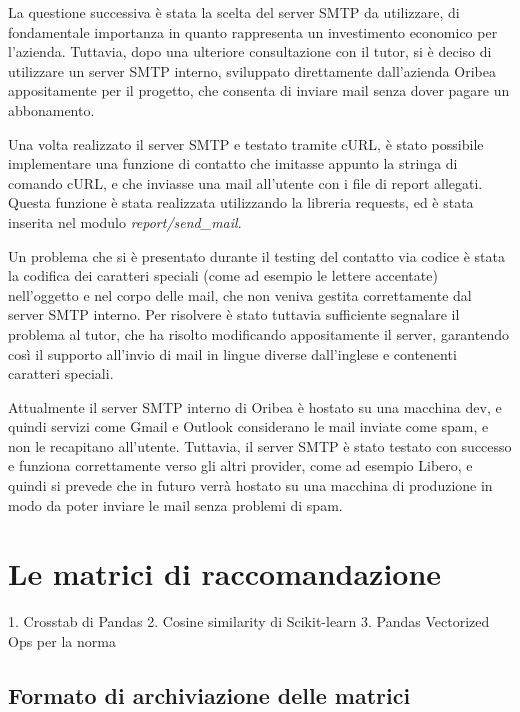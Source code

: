 La questione successiva è stata la scelta del server SMTP da utilizzare, di fondamentale importanza in quanto rappresenta un investimento economico per l'azienda.
Tuttavia, dopo una ulteriore consultazione con il tutor, si è deciso di utilizzare un server SMTP interno, sviluppato direttamente dall'azienda Oribea appositamente per il progetto, che consenta di inviare mail senza dover pagare un abbonamento.

Una volta realizzato il server SMTP e testato tramite cURL, è stato possibile implementare una funzione di contatto che imitasse appunto la stringa di comando cURL, e che inviasse una mail all'utente con i file di report allegati. Questa funzione è stata realizzata utilizzando la libreria requests, ed è stata inserita nel modulo \emph{report/send\_mail}.

Un problema che si è presentato durante il testing del contatto via codice è stata la codifica dei caratteri speciali (come ad esempio le lettere accentate) nell'oggetto e nel corpo delle mail, che non veniva gestita correttamente dal server SMTP interno. Per risolvere è stato tuttavia sufficiente segnalare il problema al tutor, che ha risolto modificando appositamente il server, garantendo così il supporto all'invio di mail in lingue diverse dall'inglese e contenenti caratteri speciali.

Attualmente il server SMTP interno di Oribea è hostato su una macchina dev, e quindi servizi come Gmail e Outlook considerano le mail inviate come spam, e non le recapitano all'utente. Tuttavia, il server SMTP è stato testato con successo e funziona correttamente verso gli altri provider, come ad esempio Libero, e quindi si prevede che in futuro verrà hostato su una macchina di produzione in modo da poter inviare le mail senza problemi di spam.


\section{Le matrici di raccomandazione}

1. Crosstab di Pandas
2. Cosine similarity di Scikit-learn
3. Pandas Vectorized Ops per la norma

\subsection{Formato di archiviazione delle matrici}

